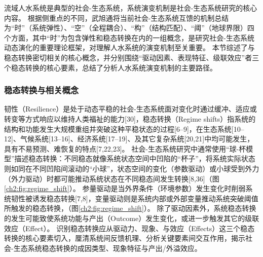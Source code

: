流域人水系统是典型的社会-生态系统，系统演变机制是社会-生态系统研究的核心内容。
根据侧重点的不同，武旭通将当前社会-生态系统互馈的机制总结为“时”（系统弹性）、“空”（全程耦合）、“构”（结构匹配）、“阈”（地球界限）四个方面，其中“时”为包含弹性和稳态转换在内的一组概念，是研究社会-生态系统动态演化的重要理论框架\cite{WuXuTong2021}，对理解人水系统的演变机制至关重要。
本节综述了与稳态转换密切相关的核心概念，并分别围绕“驱动因素、表现特征、级联效应”者三个稳态转换的核心要素，总结了分析人水系统演变机制的主要路径。

\subsubsection*{稳态转换与相关概念}

韧性（Resilience）是处于动态平稳的社会-生态系统面对变化时通过缓冲、适应或转变等方式响应以维持人类福祉的能力[30]，稳态转换（Regime shifts）指系统的结构和功能发生大规模重组并突破这种平稳状态的过程[6–9]，在生态系统[10–12]、气候系统[13–16]、经济系统[17–19]、及其它复杂系统[20,21]中均可能发生，具有不易预测、难恢复的特点[7,22,23]。
社会-生态系统研究中通常使用“球-杯模型”描述稳态转换：不同稳态就像系统状态空间中凹陷的“杯子”，将系统实际状态则如同在不同凹陷间滚动的“小球”，状态空间的变化（参数驱动）或小球受到外力（外力驱动）时都可能推动系统状态在不同稳态间发生转换[8,36]（图\ref{ch2:fig:regime_shift}）。
参量驱动是当外界条件（环境参数）发生变化时削弱系统韧性被诱发稳态转换[7,8]，变量驱动则是系统内部或外部变量推动系统突破阈值所触发的稳态转换，（图\ref{ch2:fig:regime_shift}）。
除了驱动因素外，系统稳态转换的发生可能致使系统功能与产出（Outcome）发生变化，或进一步触发其它的级联效应（Effect）。
识别稳态转换应从驱动力、现象、与效应（Effects）这三个稳态转换的核心要素切入，厘清系统间反馈机理、分析关键要素间交互作用，揭示社会-生态系统稳态转换的成因类型、现象特征与产出/外溢效应。

